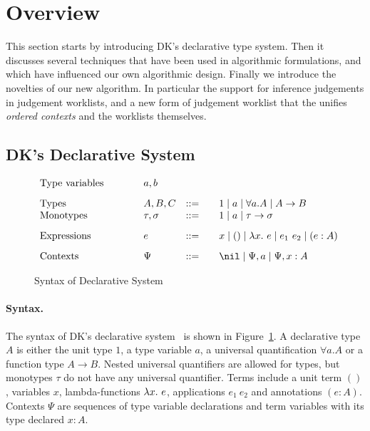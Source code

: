 \section{Overview}

This section starts by introducing DK's declarative type system. Then
it discusses several techniques that have been used in algorithmic
formulations, and which have influenced our own algorithmic design.
Finally we introduce the novelties of our new algorithm.
In particular the support for inference judgements in
judgement worklists, and a new form of judgement worklist
that the unifies \emph{ordered contexts} and the worklists themselves. 

\subsection{DK's Declarative System}

\begin{figure}[t]
\[
\begin{array}{l@{\qquad}lcl}
\text{Type variables}\qquad&a, b
\\[3mm]
\text{Types}\qquad&A, B, C &::=&\quad 1 \mid a \mid \forall a. A \mid A\to B\\
\text{Monotypes}\qquad&\tau,\sigma &::=&\quad 1 \mid a \mid \tau\to \sigma
\\[3mm]
\text{Expressions}\qquad&e &::=&\quad x \mid () \mid \lam e \mid e_1~e_2 \mid (e:A)
\\[3mm]
\text{Contexts}\qquad&\Psi &::=&\quad \nil \mid \Psi, a \mid \Psi, x:A
\end{array}
\]
\caption{Syntax of Declarative System}\label{fig:decl:syntax}
\end{figure}

\paragraph{Syntax.}
The syntax of DK's declarative system~\cite{dunfield2013complete} is shown in Figure~\ref{fig:decl:syntax}.
A declarative type $A$ is either the unit type $1$, a type variable $a$,
a universal quantification $\forall a. A$ or a function type $A \to B$.
Nested universal quantifiers are allowed for types,
but monotypes $\tau$ do not have any universal quantifier.
Terms include a unit term $()$, variables $x$, lambda-functions $\lam e$,
applications $e_1~e_2$ and annotations $(e:A)$.
Contexts $\Psi$ are sequences of type variable declarations and
term variables with its type declared $x:A$.

